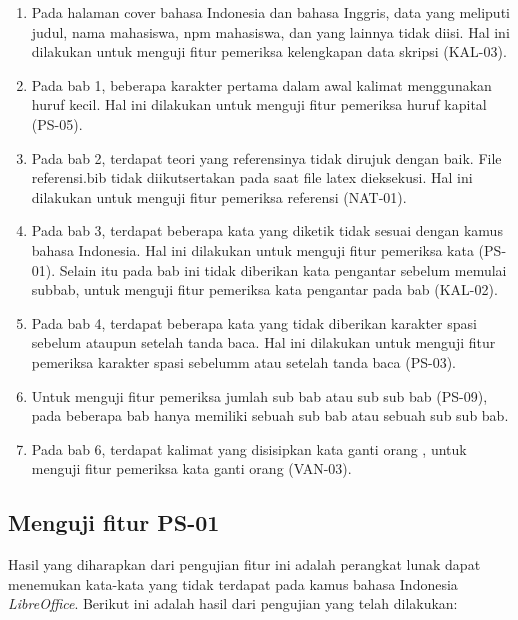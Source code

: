\begin{enumerate}
	\item Pada halaman cover bahasa Indonesia dan bahasa Inggris, data yang meliputi judul, nama mahasiswa, npm mahasiswa, dan yang lainnya tidak diisi. Hal ini dilakukan untuk menguji fitur pemeriksa kelengkapan data skripsi (KAL-03).
	
	\item Pada bab 1, beberapa karakter pertama dalam awal kalimat menggunakan huruf kecil. Hal ini dilakukan untuk menguji fitur pemeriksa huruf kapital (PS-05).
	
	\item Pada bab 2, terdapat teori yang referensinya tidak dirujuk dengan baik. File referensi.bib tidak diikutsertakan pada saat file latex dieksekusi. Hal ini dilakukan untuk menguji fitur pemeriksa referensi (NAT-01).
	
	\item Pada bab 3, terdapat beberapa kata yang diketik tidak sesuai dengan kamus bahasa Indonesia. Hal ini dilakukan untuk menguji fitur pemeriksa kata (PS-01). Selain itu pada bab ini tidak diberikan kata pengantar sebelum memulai subbab, untuk menguji fitur pemeriksa kata pengantar pada bab (KAL-02).
	
	\item Pada bab 4, terdapat beberapa kata yang tidak diberikan karakter spasi sebelum ataupun setelah tanda baca. Hal ini dilakukan untuk menguji fitur pemeriksa karakter spasi sebelumm atau setelah tanda baca (PS-03).	

	\item Untuk menguji fitur pemeriksa jumlah sub bab atau sub sub bab (PS-09), pada beberapa bab hanya memiliki sebuah sub bab atau sebuah sub sub bab.
		
	\item Pada bab 6, terdapat kalimat yang disisipkan kata ganti orang , untuk menguji fitur pemeriksa kata ganti orang (VAN-03).
\end{enumerate}

\subsection{Menguji fitur PS-01}
Hasil yang diharapkan dari pengujian fitur ini adalah perangkat lunak dapat menemukan kata-kata yang tidak terdapat pada kamus bahasa Indonesia \textit{LibreOffice}. Berikut ini adalah hasil dari pengujian yang telah dilakukan:

